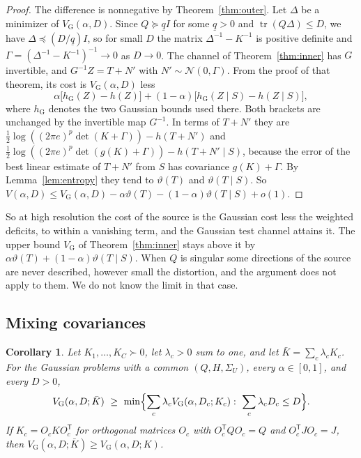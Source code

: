 \documentclass[11pt,onecolumn]{IEEEtran}
\newtheorem{corollary}[theorem]{Corollary}
\newcommand{\tr}{\operatorname{tr}}
\newcommand{\VG}{V_{\mathrm G}}
\begin{document}
\begin{proof}
The difference is nonnegative by Theorem~\ref{thm:outer}. Let
$\Delta$ be a minimizer of $\VG(\alpha,D)$. Since $Q\succeq\underline qI$ for
some $\underline q>0$ and $\tr(Q\Delta)\le D$, we have
$\Delta\preceq(D/\underline q)I$, so for small $D$ the matrix
$\Delta^{-1}-K^{-1}$ is positive definite and
$\Gamma=(\Delta^{-1}-K^{-1})^{-1}\to0$ as $D\to0$. The channel of
Theorem~\ref{thm:inner} has $G$ invertible, and $G^{-1}Z=T+N'$ with
$N'\sim\mathcal N(0,\Gamma)$. From the proof of that theorem, its cost
is $\VG(\alpha,D)$ less
\[
\alpha\bigl[h_{\mathrm G}(Z)-h(Z)\bigr]+(1-\alpha)\bigl[h_{\mathrm G}(Z\mid S)-h(Z\mid S)\bigr],
\]
where $h_{\mathrm G}$ denotes the two Gaussian bounds used there. Both
brackets are unchanged by the invertible map $G^{-1}$. In terms of
$T+N'$ they are
$\tfrac12\log((2\pi e)^p\det(K+\Gamma))-h(T+N')$ and
$\tfrac12\log((2\pi e)^p\det(g(K)+\Gamma))-h(T+N'\mid S)$, because the
error of the best linear estimate of $T+N'$ from $S$ has covariance
$g(K)+\Gamma$. By Lemma~\ref{lem:entropy} they tend to $\vartheta(T)$ and
$\vartheta(T\mid S)$. So
$V(\alpha,D)\le\VG(\alpha,D)-\alpha\vartheta(T)-(1-\alpha)\vartheta(T\mid S)+o(1)$.
\end{proof}

So at high resolution the cost of the source is the Gaussian cost
less the weighted deficits, to within a vanishing term, and the
Gaussian test channel attains it. The upper bound $\VG$ of
Theorem~\ref{thm:inner} stays above it by
$\alpha\vartheta(T)+(1-\alpha)\vartheta(T\mid S)$.
When $Q$ is singular some directions of the source are never
described, however small the distortion, and the argument does not
apply to them. We do not know the limit in that case.

\subsection{Mixing covariances}

\begin{corollary}\label{cor:mixing}
Let $K_1,\dots,K_C\succ0$, let $\lambda_c>0$ sum to one, and let
$\bar K=\sum_c\lambda_cK_c$. For the Gaussian problems with a common
$(Q,H,\Sigma_U)$, every $\alpha\in[0,1]$, and every $D>0$,
\[
\VG(\alpha,D;\bar K)\ \ge\ \min\Bigl\{\sum_c\lambda_c\VG(\alpha,D_c;K_c):\ \sum_c\lambda_cD_c\le D\Bigr\}.
\]
If $K_c=O_cKO_c^{\mathsf T}$ for orthogonal matrices $O_c$ with
$O_c^{\mathsf T}QO_c=Q$ and $O_c^{\mathsf T}JO_c=J$, then
$\VG(\alpha,D;\bar K)\ge\VG(\alpha,D;K)$.
\end{corollary}
\end{document}
